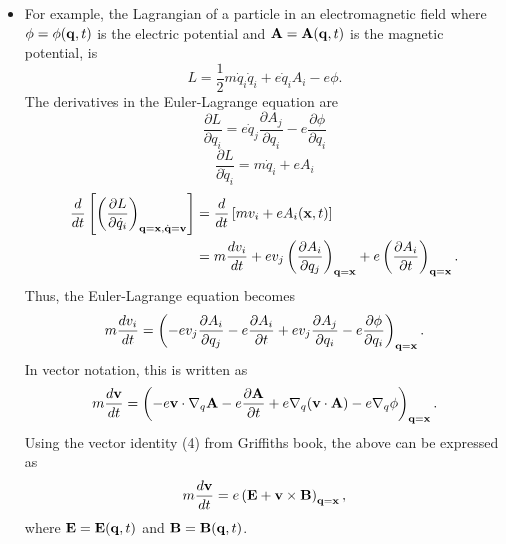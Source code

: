 \documentclass[oneside,a4paper,11pt]{report}
\newcommand{\qvecdot}{\dot{\qvec}}
\newcommand{\qdot}{\dot{q}}
\begin{document}
\begin{itemize}
\item For example, the Lagrangian of a particle in an electromagnetic field where $\phi = \phi(\mathbf{q},t)$ is the electric potential and $\mathbf{A} = \mathbf{A}(\mathbf{q},t)$ is the magnetic potential, is
\begin{equation}
L = \frac{1}{2} m \qdot_i \qdot_i + e \qdot_i A_i - e\phi.
\end{equation}
The derivatives in the Euler-Lagrange equation are
\begin{equation}
\frac{\partial L}{\partial q_i} = e \qdot_j \frac{\partial A_j }{\partial q_i} - e \frac{\partial \phi}{ \partial q_i}
\end{equation}
\begin{equation}
\frac{\partial L}{\partial \qdot_i} = m \qdot_i + e A_i 
\end{equation}
\begin{align}
\frac{d}{dt}\left [ \left ( \frac{\partial L}{\partial \qdot_i } \right )_{\qvec =  \xvec, \qvecdot= \vvec }  \right] &= \frac{d}{dt} \left [ m v_i + e A_i(\xvec,t) \right ] \nonumber \\
&= m \frac{ d v_i}{dt} + e v_j \left (\frac{\partial A_i}{\partial q_j} \right )_{\qvec = \xvec} +  e \left (\frac{\partial A_i}{\partial t} \right )_{\qvec = \xvec} .
\end{align}
Thus, the Euler-Lagrange equation becomes
\begin{equation}
\label{eq:lag_mech_tensor_lorentz}
m \frac{ d v_i}{dt} = \left ( - e v_j \frac{\partial A_i}{\partial q_j} - e\frac{\partial A_i}{\partial t} + e v_j \frac{\partial A_j }{\partial q_i} - e \frac{\partial \phi}{ \partial q_i}\right )_{\mathbf{q} = \mathbf{x}}.
\end{equation}
In vector notation, this is written as
\begin{equation}
    m \frac{d \mathbf{v}}{dt} = \left(-e\mathbf{v} \cdot \nabla_q \mathbf{A} - e \frac{\partial \mathbf{A}}{\partial t} + e \nabla_q (\mathbf{v} \cdot \mathbf{A}) - e \nabla_q \phi \right)_{\mathbf{q} = \mathbf{x}}.
\end{equation}
Using the vector identity (4) from Griffiths book, the above can be expressed as
\begin{equation}
m \frac{d\mathbf{v}}{dt} = e \left ( \mathbf{E} + \mathbf{v} \times \mathbf{B} \right)_{\mathbf{q} = \mathbf{x}},
\end{equation}
where $\mathbf{E} = \mathbf{E}(\mathbf{q},t)$ and $\mathbf{B} = \mathbf{B}(\mathbf{q},t)$.
\end{itemize}
\end{document}
